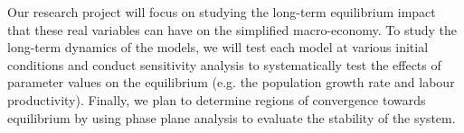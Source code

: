 \documentclass[12pt, centerh1]{article}
\begin{document}
\noindent Our research project will focus on studying the long-term equilibrium impact that these real variables can have on the simplified macro-economy. To study the long-term dynamics of the models, we will test each model at various initial conditions and conduct sensitivity analysis to systematically test the effects of parameter values on the equilibrium (e.g. the population growth rate and labour productivity). Finally, we plan to determine regions of convergence towards equilibrium by using phase plane analysis to evaluate the stability of the system.


\newpage


\newpage



\newpage
\printnomenclature
\end{document}
